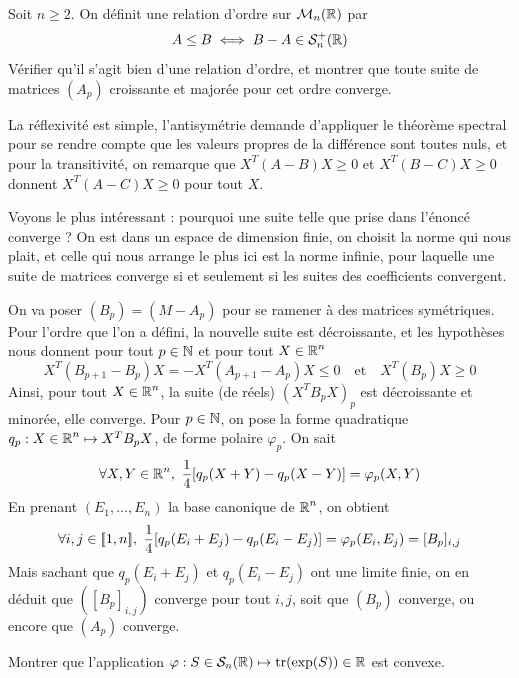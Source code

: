 \begin{exo}
	\label{euclidiens3}
	Soit $n\geq 2$.
	On définit une relation d'ordre sur $\mathcal M_n(\operatorname{\mathbb R})$ par 
	\[
		A\leq B\iff B-A\in\mathcal S_n^+(\operatorname{\mathbb R})	
	\]
	Vérifier qu'il s'agit bien d'une relation d'ordre, et montrer que toute suite de matrices $(A_p)$
	croissante et majorée pour cet ordre converge.
\end{exo}

\begin{solution}
	La réflexivité est simple, l'antisymétrie demande d'appliquer
	le théorème spectral pour se rendre compte que les valeurs propres de la différence sont toutes nuls,
	et pour la transitivité, on remarque que $X^T(A-B)X\geq 0$ et $X^T(B-C)X\geq 0$ donnent $X^T(A-C)X\geq 0$ pour tout $X$.

	Voyons le plus intéressant : pourquoi une suite telle que prise dans l'énoncé converge ? 
	On est dans un espace de dimension finie, 
	on choisit la norme qui nous plait, et celle qui nous arrange le plus ici est la norme infinie,
	pour laquelle une suite de matrices converge si et seulement si les suites des coefficients convergent. 

	On va poser $(B_p)=(M-A_p)$ pour se ramener à des matrices symétriques. 
	Pour l'ordre que l'on a défini, la nouvelle suite est décroissante, et les 
	hypothèses nous donnent pour tout $p\in\operatorname{\mathbb N}$ et pour tout $X\in\mathcal {\operatorname{\mathbb R}}^n$
	\[
		X^T(B_{p+1}-B_p)X=-X^T(A_{p+1}-A_p)X\leq 0\quad\text{et}\quad X^T(B_p)X\geq 0	
	\]
	Ainsi, pour tout $X\in\mathcal {\operatorname{\mathbb R}}^n$, la suite (de réels) $(X^TB_pX)_p$ est décroissante et minorée,
	elle converge. 
	Pour $p\in\operatorname{\mathbb N}$, on pose la forme quadratique $q_p:X\in\operatorname{\mathbb R}^n\mapsto X^TB_pX$, de forme polaire $\varphi_p$. 
	On sait 
	\[
		\forall X,Y\in\R^n,\ \frac14[q_p(X+Y)-q_p(X-Y)]=\varphi_p(X,Y)
	\]
	En prenant $(E_1,\dots,E_n)$ la base canonique de $\operatorname{\mathbb R}^n$, on obtient 
	\[
		\forall i,j\in\inl1n,\ \frac14[q_p(E_i+E_j)-q_p(E_i-E_j)]=\varphi_p(E_i,E_j)=[B_p]_{i,j}
	\]
	Mais sachant que $q_p(E_i+E_j)$ et $q_p(E_i-E_j)$ ont une limite finie, on en déduit que $([B_p]_{i,j})$ converge pour tout $i,j$,
	soit que $(B_p)$ converge, ou encore que $(A_p)$ converge.
\end{solution}

\begin{exo}[Convexité 1]
	\label{euclidiens4}
	Montrer que l'application $\varphi : S\in\mathcal S_n(\operatorname{\mathbb R})\mapsto \operatorname{tr}(\exp(S))\in\operatorname{\mathbb R}$ est convexe.
\end{exo}

